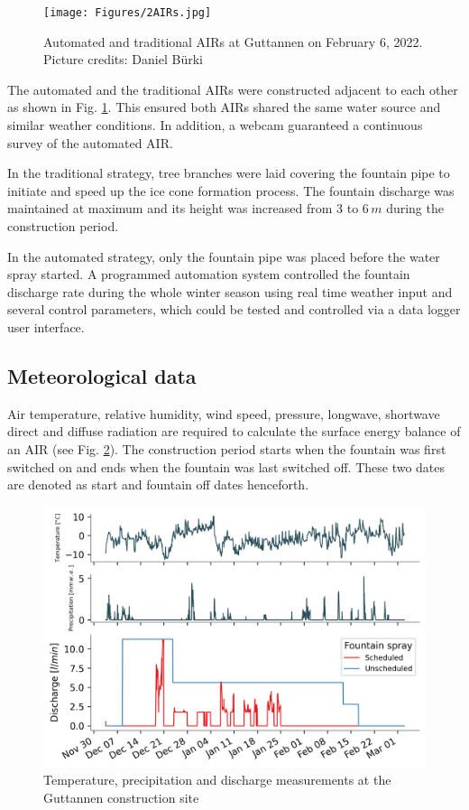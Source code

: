 \documentclass[tc, manuscript]{copernicus}
\begin{document}
\begin{figure}[t]
\texttt{[image: Figures/2AIRs.jpg]}
\caption{Automated and traditional AIRs  at Guttannen on February 6, 2022. Picture credits: Daniel Bürki}
\label{fig:2AIR} 
\end{figure}

The automated and the traditional AIRs were constructed adjacent to each other as shown in Fig. \ref{fig:2AIR}.
This ensured both AIRs shared the same water source and similar weather conditions. In addition, a webcam
guaranteed a continuous survey of the automated AIR.   

In the traditional strategy, tree branches were laid covering the fountain pipe to initiate and speed up the ice
cone formation process. The fountain discharge was maintained at maximum and its height was increased from 3 to
6\,$m$ during the construction period.

In the automated strategy, only the fountain pipe was placed before the water spray started. A programmed
automation system controlled the fountain discharge rate during the whole winter season using real time weather
input and several control parameters, which could be tested and controlled via a data logger user interface. 

\subsection{Meteorological data}

Air temperature, relative humidity, wind speed, pressure, longwave, shortwave direct and diffuse radiation are
required to calculate the surface energy balance of an AIR (see Fig. \ref{fig:aws}). The construction period
starts when the fountain was first switched on and ends when the fountain was last switched off. These two dates
are denoted as start and fountain off dates henceforth.

\begin{figure}[t]
\includegraphics[width=12cm]{Figures/data.png}
\caption{Temperature, precipitation and discharge measurements at the Guttannen construction site}
\label{fig:aws} 
\end{figure}
\end{document}

